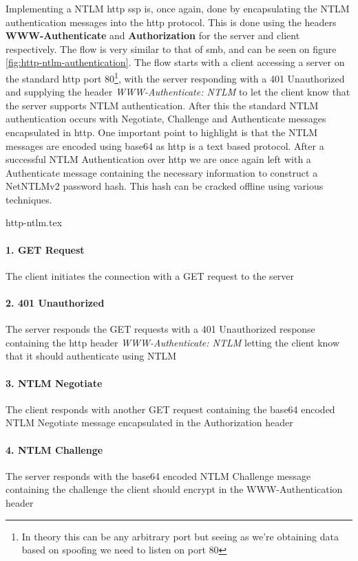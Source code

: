 \documentclass{article}
\begin{document}
\subsubsection{}
Implementing a NTLM \gls{http} \gls{ssp} is, once again, done by encapsulating the NTLM authentication messages into the \gls{http} protocol. This is done using the headers \textbf{WWW-Authenticate} and \textbf{Authorization} for the server and client respectively. The flow is very similar to that of \gls{smb}, and can be seen on figure \ref{fig:http-ntlm-authentication}. The flow starts with a client accessing a server on the standard \gls{http} port 80\footnote{In theory this can be any arbitrary port but seeing as we're obtaining data based on spoofing we need to listen on port 80}, with the server responding with a 401 Unauthorized and supplying the header \emph{WWW-Authenticate: NTLM} to let the client know that the server supports NTLM authentication. After this the standard NTLM authentication occurs with Negotiate, Challenge and Authenticate messages encapsulated in \gls{http}. One important point to highlight is that the NTLM messages are encoded using base64 as \gls{http} is a text based protocol.
After a successful NTLM Authentication over \gls{http} we are once again left with a Authenticate message containing the necessary information to construct a NetNTLMv2 password hash. This hash can be cracked offline using various techniques.

{http-ntlm.tex}
\paragraph{1. GET Request} The client initiates the connection with a GET request to the server
\paragraph{2. 401 Unauthorized} The server responds the GET requests with a 401 Unauthorized response containing the \gls{http} header \emph{WWW-Authenticate: NTLM} letting the client know that it should authenticate using NTLM
\paragraph{3. NTLM Negotiate} The client responds with another GET request containing the base64 encoded NTLM Negotiate message encapsulated in the Authorization header
\paragraph{4. NTLM Challenge} The server responds with the base64 encoded NTLM Challenge message containing the challenge the client should encrypt in the WWW-Authentication header
\end{document}
